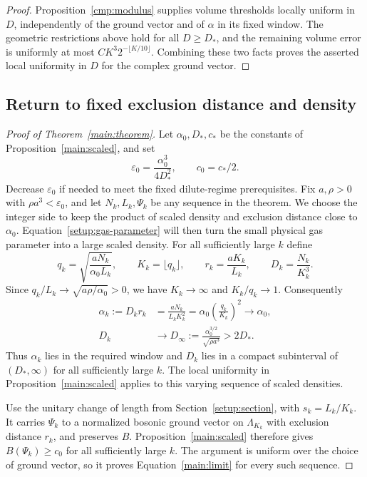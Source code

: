 \begin{proof}
Proposition~\ref{cmp:modulus} supplies volume thresholds locally
uniform in $D$, independently of the ground vector and of $\alpha$
in its fixed window. The geometric restrictions above hold for all
$D\ge D_*$, and the remaining volume error is uniformly at most
$C K^3 2^{-\lfloor K/10\rfloor}$. Combining these two facts proves
the asserted local uniformity in $D$ for the complex ground vector.
\end{proof}

\subsection{Return to fixed exclusion distance and density}

\begin{proof}[Proof of Theorem~\ref{main:theorem}]
Let $\alpha_0,D_*,c_*$ be the constants of
Proposition~\ref{main:scaled}, and set
\[
 \varepsilon_0=\frac{\alpha_0^3}{4D_*^2},\qquad c_0=c_*/2.
\]
Decrease $\varepsilon_0$ if needed to meet the fixed dilute-regime
prerequisites. Fix $a,\rho>0$ with $\rho a^3<\varepsilon_0$, and
let $N_k,L_k,\Psi_k$ be any sequence in the theorem.
We choose the integer side to keep the product of scaled density and
exclusion distance close to $\alpha_0$.
Equation~\eqref{setup:gas-parameter} will then turn the small physical
gas parameter into a large scaled density.
For all sufficiently large $k$ define
\[
 q_k=\sqrt{\frac{aN_k}{\alpha_0 L_k}},\qquad
 K_k=\lfloor q_k\rfloor,\qquad
 r_k=\frac{aK_k}{L_k},\qquad D_k=\frac{N_k}{K_k^3}.
\]
Since $q_k/L_k\to\sqrt{a\rho/\alpha_0}>0$, we have
$K_k\to\infty$ and $K_k/q_k\to1$. Consequently
\begin{align*}
 \alpha_k:=D_kr_k
   &=\frac{aN_k}{L_kK_k^2}
     =\alpha_0\left(\frac{q_k}{K_k}\right)^2
       \longrightarrow\alpha_0,\\
 D_k&\longrightarrow
       D_\infty:=\frac{\alpha_0^{3/2}}{\sqrt{\rho a^3}}
       >2D_*.
\end{align*}
Thus $\alpha_k$ lies in the required window and $D_k$ lies in a
compact subinterval of $(D_*,\infty)$ for all sufficiently large
$k$. The local uniformity in Proposition~\ref{main:scaled} applies to
this varying sequence of scaled densities.

Use the unitary change of length from Section~\ref{setup:section},
with $s_k=L_k/K_k$. It carries $\Psi_k$ to a normalized bosonic
ground vector on $\Lambda_{K_k}$ with exclusion distance $r_k$, and
preserves $B$. Proposition~\ref{main:scaled} therefore gives
$B(\Psi_k)\ge c_0$ for all sufficiently large $k$.
The argument is uniform over the choice of ground vector, so it proves
Equation~\eqref{main:limit} for every such sequence.
\end{proof}

